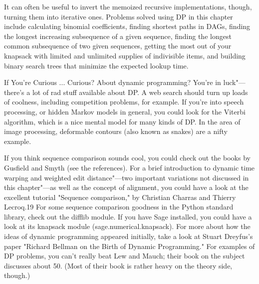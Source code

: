 It can often be useful to invert the memoized recursive implementations, though, turning them into
iterative ones. Problems solved using DP in this chapter include calculating binomial coefficients, finding shortest paths in DAGs, finding the longest increasing subsequence of a given sequence, finding the longest common subsequence of two given sequences, getting the most out of your knapsack with limited and unlimited supplies of indivisible items, and building binary search trees that minimize the expected lookup time.


If You're Curious ...
Curious? About dynamic programming? You're in luck"---there's a lot of rad stuff available about DP. A web search should turn up loads of coolness, including competition problems, for example. If you're into speech processing, or hidden Markov models in general, you could look for the Viterbi algorithm, which is a nice mental model for many kinds of DP. In the area of image processing, deformable contours (also known as snakes) are a nifty example.

If you think sequence comparison sounds cool, you could check out the books by Gusfield and
Smyth (see the references). For a brief introduction to dynamic time warping and weighted edit
distance"---two important variations not discussed in this chapter"---as well as the concept of alignment, you could have a look at the excellent tutorial "Sequence comparison," by Christian Charras and Thierry Lecroq.19 For some sequence comparison goodness in the Python standard library, check out the difflib module. If you have Sage installed, you could have a look at its knapsack module (sage.numerical.knapsack).
For more about how the ideas of dynamic programming appeared initially, take a look at Stuart
Dreyfus's paper "Richard Bellman on the Birth of Dynamic Programming." For examples of DP problems, you can't really beat Lew and Mauch; their book on the subject discusses about 50. (Most of their book is rather heavy on the theory side, though.)

